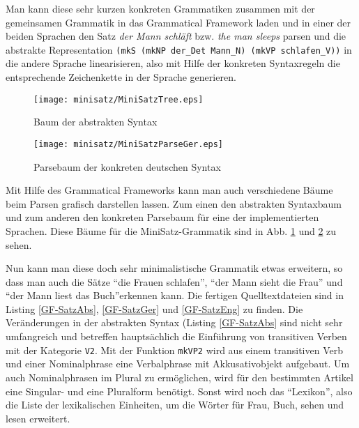 \documentclass[12pt,abstract=on,titlepage,bibliography=totoc,ngerman,listof=totoc]{scrreprt}
\begin{document}
Man kann diese sehr kurzen konkreten Grammatiken zusammen mit der gemeinsamen Grammatik in das Grammatical Framework laden und in einer der beiden Sprachen den Satz \textit{der Mann schläft} bzw. \textit{the man sleeps} parsen und die abstrakte Representation \texttt{(mkS (mkNP der\_Det Mann\_N) (mkVP schlafen\_V))} in die andere Sprache linearisieren, also mit Hilfe der konkreten Syntaxregeln die entsprechende Zeichenkette in der Sprache generieren. \par
\begin{figure}
\texttt{[image: minisatz/MiniSatzTree.eps]}
\caption{Baum der abstrakten Syntax}\label{MiniSatz-AbsTree}
\end{figure}
\begin{figure}
\texttt{[image: minisatz/MiniSatzParseGer.eps]}
\caption{Parsebaum der konkreten deutschen Syntax}\label{MiniSatz-ParseGer}
\end{figure}
Mit Hilfe des Grammatical Frameworks kann man auch verschiedene Bäume beim Parsen grafisch darstellen lassen. Zum einen den abstrakten Syntaxbaum und zum anderen den konkreten Parsebaum für eine der implementierten Sprachen. Diese Bäume für die MiniSatz-Grammatik sind in Abb. \ref{MiniSatz-AbsTree} und \ref{MiniSatz-ParseGer} zu sehen.

Nun kann man diese doch sehr minimalistische Grammatik etwas erweitern, so dass man auch die Sätze ``die Frauen schlafen'', ``der Mann sieht die Frau'' und ``der Mann liest das Buch''erkennen kann. Die fertigen Quelltextdateien sind in Listing \ref{GF-SatzAbs}, \ref{GF-SatzGer} und \ref{GF-SatzEng} zu finden. Die Veränderungen in der abstrakten Syntax (Listing \ref{GF-SatzAbs} sind nicht sehr umfangreich und betreffen hauptsächlich die Einführung von transitiven Verben mit der Kategorie \texttt{V2}. Mit der Funktion \texttt{mkVP2} wird aus einem transitiven Verb und einer Nominalphrase eine Verbalphrase mit Akkusativobjekt aufgebaut. Um auch Nominalphrasen im Plural zu ermöglichen, wird für den bestimmten Artikel eine Singular- und eine Pluralform benötigt. Sonst wird noch das ``Lexikon'', also die Liste der lexikalischen Einheiten, um die Wörter für Frau, Buch, sehen und lesen erweitert. \par

\end{document}
